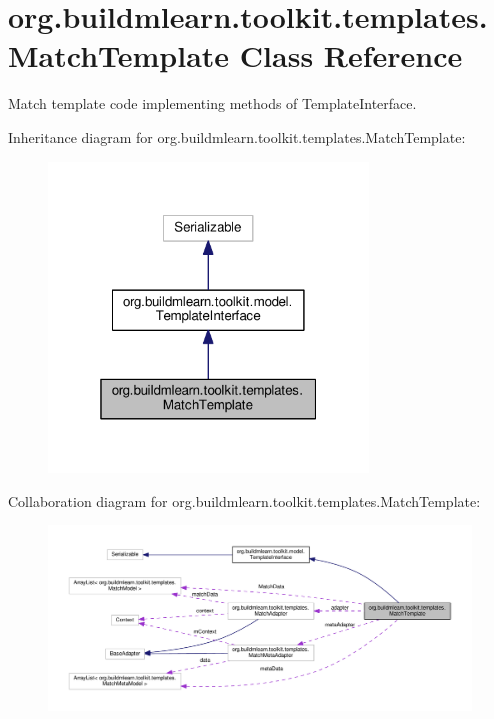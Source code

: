 \hypertarget{classorg_1_1buildmlearn_1_1toolkit_1_1templates_1_1MatchTemplate}{}\section{org.\+buildmlearn.\+toolkit.\+templates.\+Match\+Template Class Reference}
\label{classorg_1_1buildmlearn_1_1toolkit_1_1templates_1_1MatchTemplate}


Match template code implementing methods of Template\+Interface.  




Inheritance diagram for org.\+buildmlearn.\+toolkit.\+templates.\+Match\+Template\+:
\nopagebreak
\begin{figure}[H]
\begin{center}
\leavevmode
\includegraphics[width=241pt]{classorg_1_1buildmlearn_1_1toolkit_1_1templates_1_1MatchTemplate__inherit__graph}
\end{center}
\end{figure}


Collaboration diagram for org.\+buildmlearn.\+toolkit.\+templates.\+Match\+Template\+:
\nopagebreak
\begin{figure}[H]
\begin{center}
\leavevmode
\includegraphics[width=350pt]{classorg_1_1buildmlearn_1_1toolkit_1_1templates_1_1MatchTemplate__coll__graph}
\end{center}
\end{figure}
